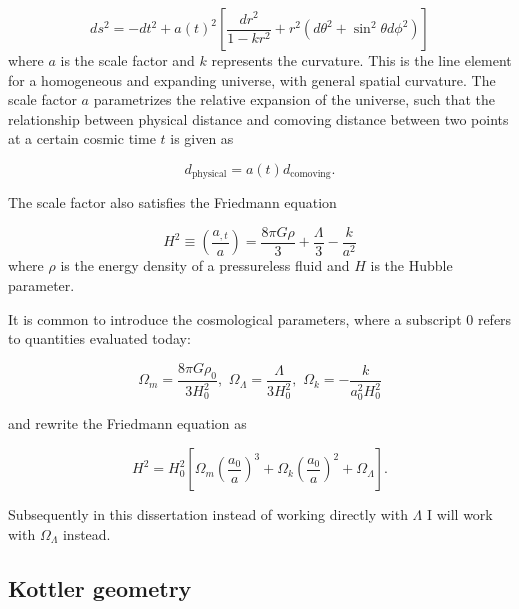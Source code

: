 \begin{equation}
  ds^2 = -dt^2 + a(t)^2 \left [ \frac{dr^2}{1-kr^2} + r^2(d\theta^2 + \sin^2\theta d\phi^2) \right ]
  \label{eq:frw-metric}
\end{equation}
where $a$ is the scale factor and $k$ represents the curvature. This is the line element for a homogeneous and expanding universe, with general spatial curvature. The scale factor $a$ parametrizes the relative expansion of the universe, such that the relationship between physical distance and comoving distance between two points at a certain cosmic time $t$ is given as

\begin{equation}
  d_{\text{physical}} = a(t) d_{\text{comoving}}.
  \label{eq:comoving-physical-distance}
\end{equation}

The scale factor also satisfies the Friedmann equation

\begin{equation}
  H^2 \equiv \left ( \frac{a_{,t}}{a} \right ) = \frac{8\pi G \rho}{3} + \frac{\Lambda}{3} - \frac{k}{a^2}
  \label{eq:friedmann-equation}
\end{equation}
where $\rho$ is the energy density of a pressureless fluid and $H$ is the Hubble parameter. 

It is common to introduce the cosmological parameters, where a subscript 0 refers to quantities evaluated today: 

\begin{equation}
  \Omega_m = \frac{8\pi G \rho_0}{3H_0^2}, \,\, \Omega_{\Lambda} = \frac{\Lambda}{3H_0^2}, \,\, \Omega_k = - \frac{k}{a_0^2 H_0^2}
  \label{eq:cosmo-params}
\end{equation}

and rewrite the Friedmann equation as

\begin{equation}
  H^2 = H_0^2 \left [ \Omega_m \left ( \frac{a_0}{a}\right )^3 + \Omega_k \left ( \frac{a_0}{a}\right )^2 + \Omega_{\Lambda} \right ]. 
  \label{eq:friedmann-eqn-version2}
\end{equation}

Subsequently in this dissertation instead of working directly with $\Lambda$ I will work with $\Omega_{\Lambda}$ instead. 

\subsection{Kottler geometry}

